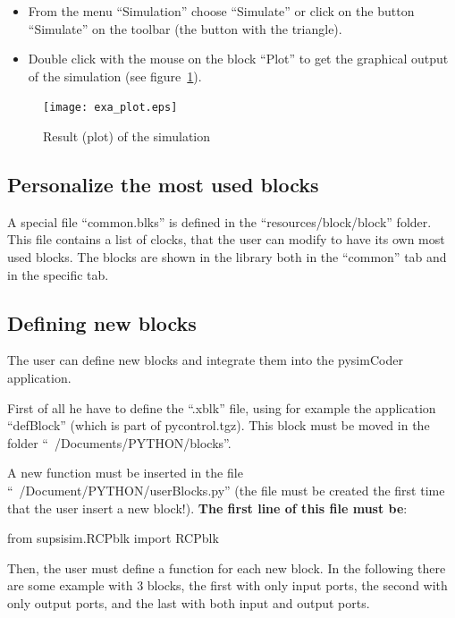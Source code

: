 \begin{itemize}
\item From the menu ``Simulation'' choose ``Simulate'' or click on the button 
``Simulate'' on the toolbar (the button with the triangle).
\item Double click with the mouse on the block ``Plot'' to get the graphical 
output of the simulation (see figure~\ref{Fig:exaplot}).
\end{itemize}

\begin{figure}[htbp]	%
\centering
\texttt{[image: exa\_plot.eps]}
\caption{Result (plot) of the simulation}
\label{Fig:exaplot}
\end{figure}

\subsection{Personalize the most used blocks}
A special file ``common.blks'' is defined in the ``resources/block/block'' 
folder. This file contains a list of clocks, that the user can modify to have 
its own most used blocks. The blocks are shown in the library both in the 
``common'' tab and in the specific tab.

\subsection{Defining new blocks}
The user can define new blocks and integrate them into the pysimCoder application.

First of all he have to define the ``.xblk'' file, using for example the 
application ``defBlock'' (which is part of pycontrol.tgz). This block must be 
moved in the folder ``~/Documents/PYTHON/blocks''.

A new function must be inserted in the file ``~/Document/PYTHON/userBlocks.py'' 
(the file must be created the first time that the user insert a new block!). 
\textbf{The first line of this file must be}:

\begin{code}
from supsisim.RCPblk import RCPblk
\end{code}

Then, the user must define a function for each new block. In the following there 
are some example with 3 blocks, the first with only input ports, the second with 
only output ports, and the last with both input and output ports.

